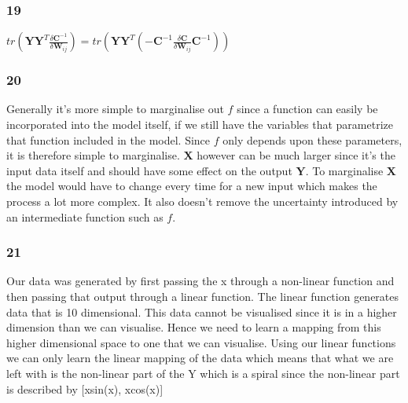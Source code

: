 \documentclass[11pt]{article}
\begin{document}
    \subsubsection*{19}\label{section}


\(tr ( \pmb Y\pmb Y^T \frac{\delta\pmb C^{-1}}{\delta\pmb W_{ij}}) = tr ( \pmb Y\pmb Y^T (-\pmb C^{-1} \frac{\delta\pmb C}{\delta\pmb W_{ij}}\pmb C^{-1}))\)

    \subsubsection*{20}\label{section}

Generally it's more simple to marginalise out \(f\) since a function can
easily be incorporated into the model itself, if we still have the
variables that parametrize that function included in the model. Since
\(f\) only depends upon these parameters, it is therefore simple to
marginalise. \(\boldsymbol{X}\) however can be much larger since it's
the input data itself and should have some effect on the output
\(\boldsymbol{Y}\). To marginalise \(\boldsymbol{X}\) the model would
have to change every time for a new input which makes the process a lot
more complex. It also doesn't remove the uncertainty introduced by an
intermediate function such as \(f\).

    \subsubsection*{21}\label{section}

Our data was generated by first passing the x through a non-linear
function and then passing that output through a linear function. The
linear function generates data that is 10 dimensional. This data cannot
be visualised since it is in a higher dimension than we can visualise.
Hence we need to learn a mapping from this higher dimensional space to
one that we can visualise. Using our linear functions we can only learn
the linear mapping of the data which means that what we are left with is
the non-linear part of the Y which is a spiral since the non-linear part
is described by {[}xsin(x), xcos(x){]}
    \begin{center}
    \end{center}
    { \hspace*{\fill} \\}
\end{document}
